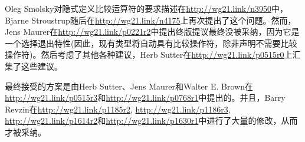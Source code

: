 Oleg Smolsky对隐式定义比较运算符的要求描述在\url{http://wg21.link/n3950}中，Bjarne Stroustrup随后在\url{http://wg21.link/n4175}上再次提出了这个问题。然而，Jens Maurer在\url{http://wg21.link/p0221r2}中提出终版提议最终没被采纳，因为它是一个选择退出特性(因此，现有类型将自动具有比较操作符，除非声明不需要比较操作符)。然后考虑了其他各种建议，Herb Sutter在\url{http://wg21.link/p0515r0}上汇集了这些建议。

最终接受的方案是由Herb Sutter、Jens Maurer和Walter E. Brown在\url{http://wg21.link/p0515r3}和\url{http://wg21.link/p0768r1}中提出的。并且，Barry Revzin在\url{http://wg21.link/p1185r2}, \url{http://wg21.link/p1186r3}, \url{http://wg21.link/p1614r2}和\url{http://wg21.link/p1630r1}中进行了大量的修改，从而才被采纳。